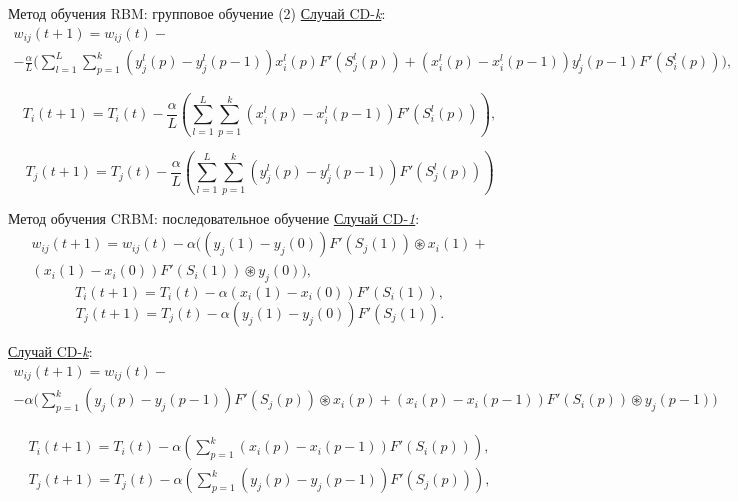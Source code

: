 \documentclass[10pt]{beamer}
\begin{document}
        \begin{frame}{Метод обучения RBM: групповое обучение (2)}
            \underline{Случай CD-\textit{k}}:
            \begin{multline*}
                w_{ij}(t+1)=w_{ij}(t)-\\-\frac{\alpha}{L}\Bigg(\sum_{l=1}^L\sum_{p=1}^k (y_j^l(p)-y_j^l(p-1))x_i^l(p)F'(S_j^l(p))+(x_i^l(p)-x_i^l(p-1))y_j^l(p-1)F'(S_i^l(p))\Bigg),
            \end{multline*}

            \begin{equation*}
                T_{i}(t+1)=T_{i}(t)-\frac{\alpha}{L}\left(\sum_{l=1}^L\sum_{p=1}^k (x_i^l(p)-x_i^l(p-1))F'(S_i^l(p))\right),
            \end{equation*}

            \begin{equation*}
                T_{j}(t+1)=T_{j}(t)-\frac{\alpha}{L}\left(\sum_{l=1}^L\sum_{p=1}^k (y_j^l(p)-y_j^l(p-1))F'(S_j^l(p))\right)
            \end{equation*}
        \end{frame}

        \begin{frame}{Метод обучения CRBM: последовательное обучение}
            \underline{Случай CD-\textit{1}}:
            \begin{multline*}
                w_{ij}(t+1)=w_{ij}(t)-\alpha((y_j(1)-y_j(0))F'(S_j(1))\circledast x_i(1)+\\(x_i(1)-x_i(0))F'(S_i(1))\circledast y_j(0)),    
            \end{multline*}
            \begin{equation*}
                T_i(t+1)=T_i(t)-\alpha(x_i(1)-x_i(0))F'(S_i(1)),
            \end{equation*}
            \begin{equation*}
                T_j(t+1)=T_j(t)-\alpha(y_j(1)-y_j(0))F'(S_j(1)).  
            \end{equation*}

            \underline{Случай CD-\textit{k}}:
            \begin{multline*}
                w_{ij}(t+1)=w_{ij}(t)-\\-\alpha\Bigg(\sum_{p=1}^k (y_j(p)-y_j(p-1))F'(S_j(p)) \circledast x_i(p) +(x_i(p)-x_i(p-1))F'(S_i(p)) \circledast y_j(p-1)\Bigg)
            \end{multline*}

            \begin{equation*}
            \begin{aligned}
                T_i(t+1)=T_i(t)-\alpha\left(\sum_{p=1}^k (x_i(p)-x_i(p-1))F'(S_i(p))\right),\\
                T_j(t+1)=T_j(t)-\alpha\left(\sum_{p=1}^k (y_j(p)-y_j(p-1))F'(S_j(p))\right),
            \end{aligned}
            \end{equation*}
        \end{frame}
\end{document}
